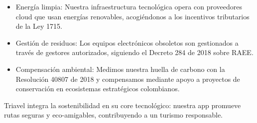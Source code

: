 \begin{itemize}
    \item Energía limpia: Nuestra infraestructura tecnológica opera con proveedores cloud que usan energías renovables, acogiéndonos a los incentivos tributarios de la Ley 1715.
    \item Gestión de residuos: Los equipos electrónicos obsoletos son gestionados a través de gestores autorizados, siguiendo el Decreto 284 de 2018 sobre RAEE.
    \item Compensación ambiental: Medimos nuestra huella de carbono con la Resolución 40807 de 2018 y compensamos mediante apoyo a proyectos de conservación en ecosistemas estratégicos colombianos.
\end{itemize}

Triavel integra la sostenibilidad en su core tecnológico: nuestra app promueve rutas seguras y eco-amigables, contribuyendo a un turismo responsable.
